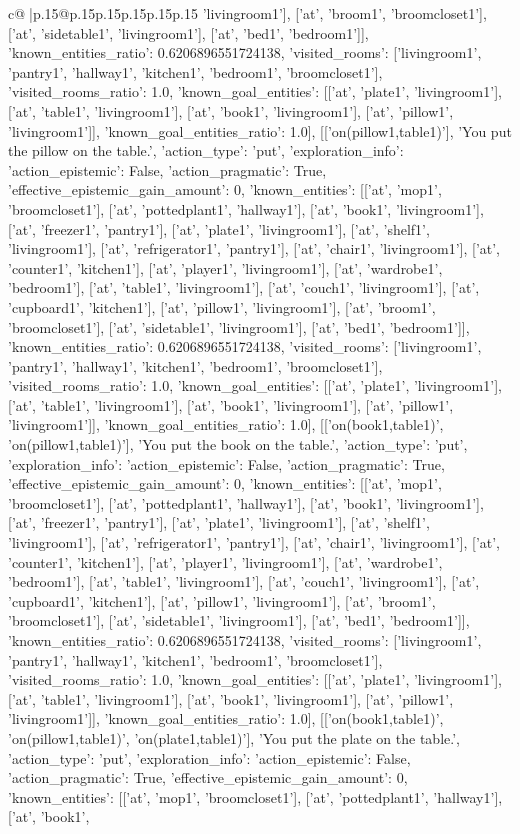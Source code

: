 \documentclass{article}
\begin{document}
{\begin{supertabular}{c@{$\;$}|p{.15\linewidth}@{}p{.15\linewidth}p{.15\linewidth}p{.15\linewidth}p{.15\linewidth}p{.15\linewidth}}
{{{'livingroom1'], ['at', 'broom1', 'broomcloset1'], ['at', 'sidetable1', 'livingroom1'], ['at', 'bed1', 'bedroom1']], 'known_entities_ratio': 0.6206896551724138, 'visited_rooms': ['livingroom1', 'pantry1', 'hallway1', 'kitchen1', 'bedroom1', 'broomcloset1'], 'visited_rooms_ratio': 1.0, 'known_goal_entities': [['at', 'plate1', 'livingroom1'], ['at', 'table1', 'livingroom1'], ['at', 'book1', 'livingroom1'], ['at', 'pillow1', 'livingroom1']], 'known_goal_entities_ratio': 1.0}}], [['on(pillow1,table1)'], 'You put the pillow on the table.', {'action_type': 'put', 'exploration_info': {'action_epistemic': False, 'action_pragmatic': True, 'effective_epistemic_gain_amount': 0, 'known_entities': [['at', 'mop1', 'broomcloset1'], ['at', 'pottedplant1', 'hallway1'], ['at', 'book1', 'livingroom1'], ['at', 'freezer1', 'pantry1'], ['at', 'plate1', 'livingroom1'], ['at', 'shelf1', 'livingroom1'], ['at', 'refrigerator1', 'pantry1'], ['at', 'chair1', 'livingroom1'], ['at', 'counter1', 'kitchen1'], ['at', 'player1', 'livingroom1'], ['at', 'wardrobe1', 'bedroom1'], ['at', 'table1', 'livingroom1'], ['at', 'couch1', 'livingroom1'], ['at', 'cupboard1', 'kitchen1'], ['at', 'pillow1', 'livingroom1'], ['at', 'broom1', 'broomcloset1'], ['at', 'sidetable1', 'livingroom1'], ['at', 'bed1', 'bedroom1']], 'known_entities_ratio': 0.6206896551724138, 'visited_rooms': ['livingroom1', 'pantry1', 'hallway1', 'kitchen1', 'bedroom1', 'broomcloset1'], 'visited_rooms_ratio': 1.0, 'known_goal_entities': [['at', 'plate1', 'livingroom1'], ['at', 'table1', 'livingroom1'], ['at', 'book1', 'livingroom1'], ['at', 'pillow1', 'livingroom1']], 'known_goal_entities_ratio': 1.0}}], [['on(book1,table1)', 'on(pillow1,table1)'], 'You put the book on the table.', {'action_type': 'put', 'exploration_info': {'action_epistemic': False, 'action_pragmatic': True, 'effective_epistemic_gain_amount': 0, 'known_entities': [['at', 'mop1', 'broomcloset1'], ['at', 'pottedplant1', 'hallway1'], ['at', 'book1', 'livingroom1'], ['at', 'freezer1', 'pantry1'], ['at', 'plate1', 'livingroom1'], ['at', 'shelf1', 'livingroom1'], ['at', 'refrigerator1', 'pantry1'], ['at', 'chair1', 'livingroom1'], ['at', 'counter1', 'kitchen1'], ['at', 'player1', 'livingroom1'], ['at', 'wardrobe1', 'bedroom1'], ['at', 'table1', 'livingroom1'], ['at', 'couch1', 'livingroom1'], ['at', 'cupboard1', 'kitchen1'], ['at', 'pillow1', 'livingroom1'], ['at', 'broom1', 'broomcloset1'], ['at', 'sidetable1', 'livingroom1'], ['at', 'bed1', 'bedroom1']], 'known_entities_ratio': 0.6206896551724138, 'visited_rooms': ['livingroom1', 'pantry1', 'hallway1', 'kitchen1', 'bedroom1', 'broomcloset1'], 'visited_rooms_ratio': 1.0, 'known_goal_entities': [['at', 'plate1', 'livingroom1'], ['at', 'table1', 'livingroom1'], ['at', 'book1', 'livingroom1'], ['at', 'pillow1', 'livingroom1']], 'known_goal_entities_ratio': 1.0}}], [['on(book1,table1)', 'on(pillow1,table1)', 'on(plate1,table1)'], 'You put the plate on the table.', {'action_type': 'put', 'exploration_info': {'action_epistemic': False, 'action_pragmatic': True, 'effective_epistemic_gain_amount': 0, 'known_entities': [['at', 'mop1', 'broomcloset1'], ['at', 'pottedplant1', 'hallway1'], ['at', 'book1', }}}
\end{supertabular}}
\end{document}
